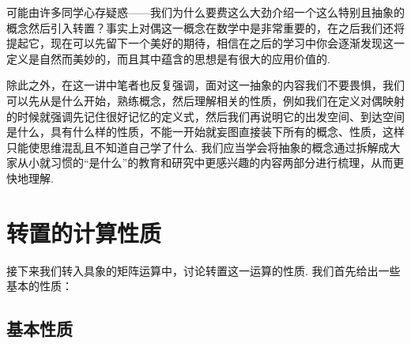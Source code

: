 可能由许多同学心存疑惑——我们为什么要费这么大劲介绍一个这么特别且抽象的概念然后引入转置？事实上对偶这一概念在数学中是非常重要的，在之后我们还将提起它，现在可以先留下一个美好的期待，相信在之后的学习中你会逐渐发现这一定义是自然而美妙的，而且其中蕴含的思想是有很大的应用价值的.

除此之外，在这一讲中笔者也反复强调，面对这一抽象的内容我们不要畏惧，我们可以先从是什么开始，熟练概念，然后理解相关的性质，例如我们在定义对偶映射的时候就强调先记住很好记忆的定义式，然后我们再说明它的出发空间、到达空间是什么，具有什么样的性质，不能一开始就妄图直接装下所有的概念、性质，这样只能使思维混乱且不知道自己学了什么. 我们应当学会将抽象的概念通过拆解成大家从小就习惯的``是什么''的教育和研究中更感兴趣的内容两部分进行梳理，从而更快地理解.

\section{转置的计算性质}

接下来我们转入具象的矩阵运算中，讨论转置这一运算的性质. 我们首先给出一些基本的性质：

\subsection{基本性质}

